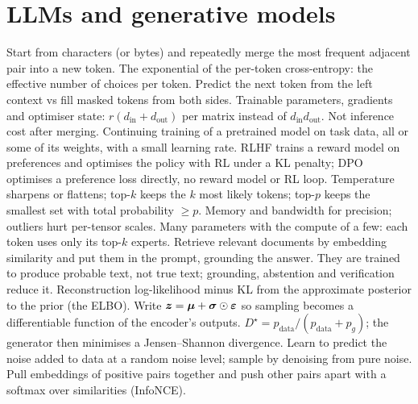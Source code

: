 \section{LLMs and generative models}
\begin{rapid}
	 Start from characters (or bytes) and repeatedly merge the most frequent adjacent pair into a new token.
	 The exponential of the per-token cross-entropy: the effective number of choices per token.
	 Predict the next token from the left context vs fill masked tokens from both sides.
	 Trainable parameters, gradients and optimiser state: $r(d_\text{in}+d_\text{out})$ per matrix instead of
	$d_\text{in}d_\text{out}$. Not inference cost after merging.
	 Continuing training of a pretrained model on task data, all or some of its weights, with a small
	learning rate.
	 RLHF trains a reward model on preferences and optimises the policy with RL under a KL penalty; DPO optimises a
	preference loss directly, no reward model or RL loop.
	 Temperature sharpens or flattens; top-$k$ keeps the $k$ most likely tokens; top-$p$ keeps the
	smallest set with total probability $\ge p$.
	 Memory and bandwidth for precision; outliers hurt per-tensor scales.
	 Many parameters with the compute of a few: each token uses only its top-$k$ experts.
	 Retrieve relevant documents by embedding similarity and put them in the prompt, grounding the answer.
	 They are trained to produce probable text, not true text; grounding, abstention and verification
	reduce it.
	 Reconstruction log-likelihood minus KL from the approximate posterior to the prior (the ELBO).
	 Write ${\bm{z}}={\bm{\mu}}+\bm\sigma\odot\bm{\varepsilon}$ so sampling becomes a differentiable function of the encoder's
	outputs.
	 $D^\star=p_\text{data}/(p_\text{data}+p_g)$; the generator then minimises a Jensen--Shannon divergence.
	 Learn to predict the noise added to data at a random noise level; sample by denoising from pure noise.
	 Pull embeddings of positive pairs together and push other pairs apart with a softmax over similarities
	(InfoNCE).
\end{rapid}

